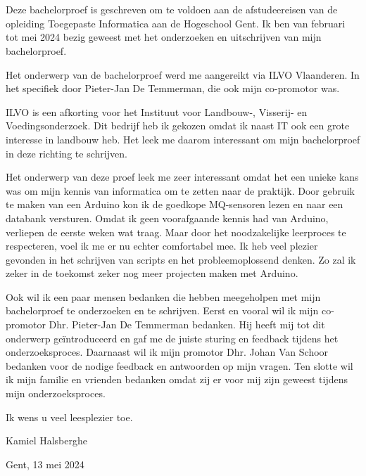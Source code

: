 
\chapter*{}%
\label{ch:voorwoord}


Deze bachelorproef is geschreven om te voldoen aan de afstudeereisen van de opleiding Toegepaste Informatica aan de Hogeschool Gent. Ik ben van februari tot mei 2024 bezig geweest met het onderzoeken en uitschrijven van mijn bachelorproef.\par

Het onderwerp van de bachelorproef werd me aangereikt via ILVO Vlaanderen. In het specifiek door Pieter-Jan De Temmerman, die ook mijn co-promotor was.\par

ILVO is een afkorting voor het Instituut voor Landbouw-, Visserij- en Voedingsonderzoek. Dit bedrijf heb ik gekozen omdat ik naast IT ook een grote interesse in landbouw heb. Het leek me daarom interessant om mijn bachelorproef in deze richting te schrijven.\par

Het onderwerp van deze proef leek me zeer interessant omdat het een unieke kans was om mijn kennis van informatica om te zetten naar de praktijk. Door gebruik te maken van een Arduino kon ik de goedkope MQ-sensoren lezen en naar een databank versturen. Omdat ik geen voorafgaande kennis had van Arduino, verliepen de eerste weken wat traag. Maar door het noodzakelijke leerproces te respecteren, voel ik me er nu echter comfortabel mee. Ik heb veel plezier gevonden in het schrijven van scripts en het probleemoplossend denken. Zo zal ik zeker in de toekomst zeker nog meer projecten maken met Arduino.\par

Ook wil ik een paar mensen bedanken die hebben meegeholpen met mijn bachelorproef te onderzoeken en te schrijven.
Eerst en vooral wil ik mijn co-promotor Dhr. Pieter-Jan De Temmerman bedanken. Hij heeft mij tot dit onderwerp geïntroduceerd en gaf me de juiste sturing en feedback tijdens het onderzoeksproces.
Daarnaast wil ik mijn promotor Dhr. Johan Van Schoor bedanken voor de nodige feedback en antwoorden op mijn vragen.
Ten slotte wil ik mijn familie en vrienden bedanken omdat zij er voor mij zijn geweest tijdens mijn onderzoeksproces.\par

Ik wens u veel leesplezier toe.\par

Kamiel Halsberghe\par

Gent, 13 mei 2024
